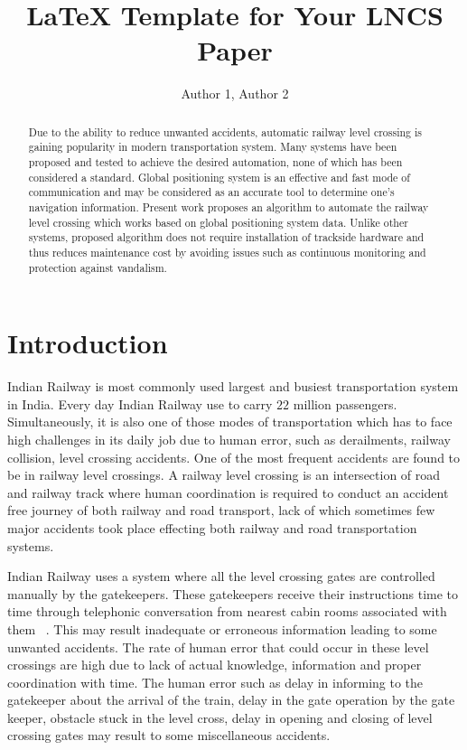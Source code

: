 \documentclass{llncs}
\begin{document}
\title{LaTeX Template for Your LNCS Paper}

\author{Author 1, Author 2}

\maketitle

\begin{abstract}

Due to the ability to reduce unwanted accidents, automatic railway level crossing is gaining popularity in modern transportation system. Many systems have been proposed and tested to achieve the desired automation, none of which has been considered a standard. Global positioning system is an effective and fast mode of communication and may be considered as an accurate tool to determine one’s navigation information. Present work proposes an algorithm to automate the railway level crossing which works based on global positioning system data. Unlike other systems, proposed algorithm does not require installation of trackside hardware and thus reduces maintenance cost by avoiding issues such as continuous monitoring and protection against vandalism.\\

\end{abstract}

\section{Introduction}\label{sec:Introduction}

Indian Railway is most commonly used largest and busiest transportation system in India. Every day Indian Railway use to carry $22$ million passengers. Simultaneously, it is also one of those modes of transportation which has to face high challenges in its daily job due to human error, such as derailments, railway collision, level crossing accidents. One of the most frequent accidents are found to be in railway level crossings. A railway level crossing is an intersection of road and railway track where human coordination is required to conduct an accident free journey of both railway and road transport, lack of which sometimes few major accidents took place effecting both railway and road transportation systems.

Indian Railway uses a system where all the level crossing gates are controlled manually by the gatekeepers. These gatekeepers receive their instructions time to time through telephonic conversation from nearest cabin rooms associated with them ~\cite{b1}. This may result inadequate or erroneous information leading to some unwanted accidents. The rate of human error that could occur in these level crossings are high due to lack of actual knowledge, information and proper coordination with time. The human error such as  delay in informing to the gatekeeper about the arrival of the train, delay in the gate operation by the gate keeper, obstacle stuck in the level cross, delay in opening and closing of level crossing gates may result to some miscellaneous accidents. 
\end{document}
